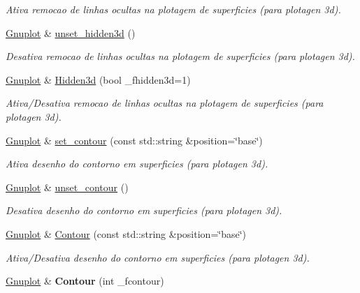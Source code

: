 \begin{DoxyCompactItemize}
\begin{DoxyCompactList}\small\item\em Ativa remocao de linhas ocultas na plotagem de superficies (para plotagen 3d). \end{DoxyCompactList}\item 
\hypertarget{classGnuplot_a763ff17df1679cc2b1463b024aa89ebc}{\hyperlink{classGnuplot}{Gnuplot} \& \hyperlink{classGnuplot_a763ff17df1679cc2b1463b024aa89ebc}{unset\-\_\-hidden3d} ()}\label{classGnuplot_a763ff17df1679cc2b1463b024aa89ebc}

\begin{DoxyCompactList}\small\item\em Desativa remocao de linhas ocultas na plotagem de superficies (para plotagen 3d). \end{DoxyCompactList}\item 
\hypertarget{classGnuplot_a9004d7b6d322be1eeb32eb8eb0c25487}{\hyperlink{classGnuplot}{Gnuplot} \& \hyperlink{classGnuplot_a9004d7b6d322be1eeb32eb8eb0c25487}{Hidden3d} (bool \-\_\-fhidden3d=1)}\label{classGnuplot_a9004d7b6d322be1eeb32eb8eb0c25487}

\begin{DoxyCompactList}\small\item\em Ativa/\-Desativa remocao de linhas ocultas na plotagem de superficies (para plotagen 3d). \end{DoxyCompactList}\item 
\hyperlink{classGnuplot}{Gnuplot} \& \hyperlink{classGnuplot_af845efc728a90d7e10de764eff0b2423}{set\-\_\-contour} (const std\-::string \&position=\char`\"{}base\char`\"{})
\begin{DoxyCompactList}\small\item\em Ativa desenho do contorno em superficies (para plotagen 3d). \end{DoxyCompactList}\item 
\hypertarget{classGnuplot_a39d10e6ce85875939a9c594d132a10d7}{\hyperlink{classGnuplot}{Gnuplot} \& \hyperlink{classGnuplot_a39d10e6ce85875939a9c594d132a10d7}{unset\-\_\-contour} ()}\label{classGnuplot_a39d10e6ce85875939a9c594d132a10d7}

\begin{DoxyCompactList}\small\item\em Desativa desenho do contorno em superficies (para plotagen 3d). \end{DoxyCompactList}\item 
\hyperlink{classGnuplot}{Gnuplot} \& \hyperlink{classGnuplot_a826a0f860cd984748f8c7ee80228fce7}{Contour} (const std\-::string \&position=\char`\"{}base\char`\"{})
\begin{DoxyCompactList}\small\item\em Ativa/\-Desativa desenho do contorno em superficies (para plotagen 3d). \end{DoxyCompactList}\item 
\hypertarget{classGnuplot_ab2918e5653c9d421bf924d7dc2467429}{\hyperlink{classGnuplot}{Gnuplot} \& {\bfseries Contour} (int \-\_\-fcontour)}\label{classGnuplot_ab2918e5653c9d421bf924d7dc2467429}


\end{DoxyCompactItemize}
